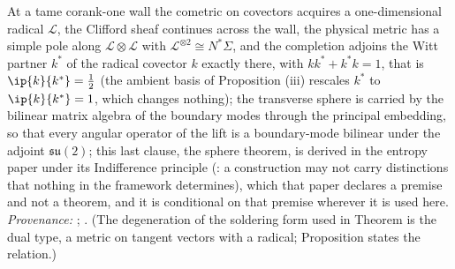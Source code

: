 At a tame corank-one wall the cometric on covectors acquires a one-dimensional radical $\mathcal{L}$, the Clifford sheaf continues across the wall, the physical metric has a simple pole along $\mathcal{L}\otimes\mathcal{L}$ with $\mathcal{L}^{\otimes 2} \cong N^*\Sigma$, and the completion adjoins the Witt partner $k^*$ of the radical covector $k$ exactly there, with $kk^* + k^*k = 1$, that is $\ip{k}{k^*} = \tfrac12$ (the ambient basis of Proposition (iii) rescales $k^*$ to $\ip{k}{k^*} = 1$, which changes nothing); the transverse sphere is carried by the bilinear matrix algebra of the boundary modes through the principal embedding, so that every angular operator of the lift is a boundary-mode bilinear under the adjoint $\mathfrak{su}(2)$; this last clause, the sphere theorem, is derived in the entropy paper under its Indifference principle (\cite[Principle~5.4]{ButlerT8}: a construction may not carry distinctions that nothing in the framework determines), which that paper declares a premise and not a theorem, and it is conditional on that premise wherever it is used here. \emph{Provenance:} \cite[Thm.~3.1, Cor.~4.5, Thm.~6.2]{ButlerT4}; \cite[Prop.~5.2, Principle~5.4, Thm.~5.5, Prop.~5.6]{ButlerT8}. (The degeneration of the soldering form used in Theorem  is the dual type, a metric on tangent vectors with a radical; Proposition  states the relation.)
